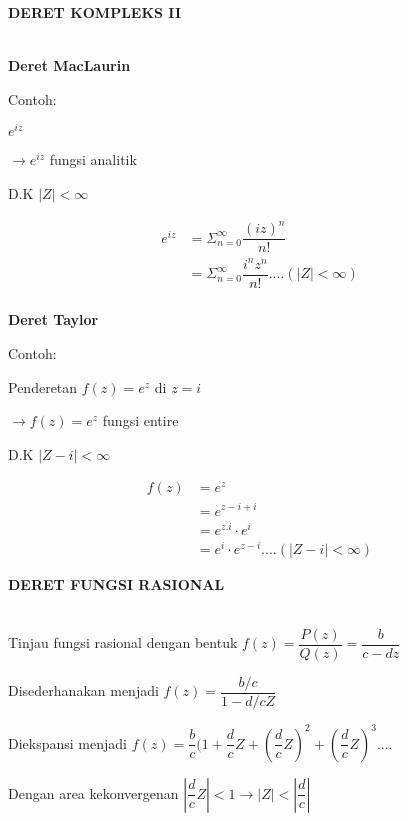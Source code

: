 \documentclass{article}
\begin{document}
\newpage
\begin{center}
    \textbf{DERET KOMPLEKS II}
\end{center}
\leavevmode\\

\textbf{Deret MacLaurin}

Contoh:

$e^{iz}$

$\rightarrow e^{iz}$ fungsi analitik

D.K $|Z|<\infty$

\begin{align}
    e^{iz} & = \Sigma_{n=0}^{\infty} \dfrac{(iz)^n}{n!}
    \nonumber                                                               \\
           & = \Sigma_{n=0}^{\infty} \dfrac{i^n z^n}{n!} .... (|Z|< \infty)
    \nonumber
\end{align}
\leavevmode\\

\textbf{Deret Taylor}

Contoh:

Penderetan $f(z) = e^z$ di $z = i$

$\rightarrow f(z) = e^z$ fungsi entire

D.K $|Z-i|<\infty$

\begin{align}
    f(z) & = e^z
    \nonumber                                       \\
         & = e^{z-i+i}
    \nonumber                                       \\
         & = e^{z.i} \cdot e^i
    \nonumber                                       \\
         & = e^i \cdot e^{z-i} .... (|Z-i|< \infty)
    \nonumber
\end{align}

\newpage
\begin{center}
    \textbf{DERET FUNGSI RASIONAL}
\end{center}
\leavevmode\\

Tinjau fungsi rasional dengan bentuk $f(z) = \dfrac{P(z)}{Q(z)} = \dfrac{b}{c-dz}$

Disederhanakan menjadi $f(z) = \dfrac{b/c}{1-d/c Z}$

Diekspansi menjadi $f(z) = \dfrac{b}{c}(1+\dfrac{d}{c}Z+(\dfrac{d}{c}Z)^2+(\dfrac{d}{c}Z)^3....$

Dengan area kekonvergenan $|\dfrac{d}{c}Z|<1 \rightarrow |Z|<|\dfrac{d}{c}|$
\end{document}
